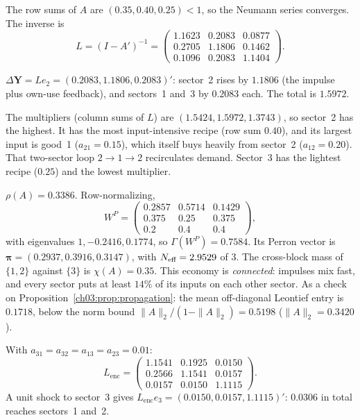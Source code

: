 \documentclass[../solutions_manual.tex]{subfiles}
\begin{document}

 The row sums of $A$ are $(0.35, 0.40, 0.25) < 1$, so the Neumann series converges. The inverse is
\[
L = (I - A')^{-1} = \begin{pmatrix} 1.1623 & 0.2083 & 0.0877\\ 0.2705 & 1.1806 & 0.1462\\ 0.1096 & 0.2083 & 1.1404\end{pmatrix}.
\]

 $\Delta\mathbf Y = L e_2 = (0.2083, 1.1806, 0.2083)'$: sector~2 rises by $1.1806$ (the impulse plus own-use feedback), and sectors~1 and~3 by $0.2083$ each. The total is $1.5972$.

 The multipliers (column sums of $L$) are $(1.5424, 1.5972, 1.3743)$, so sector~2 has the highest. It has the most input-intensive recipe (row sum $0.40$), and its largest input is good~1 ($a_{21} = 0.15$), which itself buys heavily from sector~2 ($a_{12} = 0.20$). That two-sector loop $2 \to 1 \to 2$ recirculates demand. Sector~3 has the lightest recipe ($0.25$) and the lowest multiplier.

 $\rho(A) = 0.3386$. Row-normalizing,
\[
W^P = \begin{pmatrix} 0.2857 & 0.5714 & 0.1429\\ 0.375 & 0.25 & 0.375\\ 0.2 & 0.4 & 0.4\end{pmatrix},
\]
with eigenvalues $1, -0.2416, 0.1774$, so $\Gamma(W^P) = 0.7584$. Its Perron vector is $\boldsymbol\pi = (0.2937, 0.3916, 0.3147)$, with $N_{\text{eff}} = 2.9529$ of 3. The cross-block mass of $\{1,2\}$ against $\{3\}$ is $\chi(A) = 0.35$. This economy is \emph{connected}: impulses mix fast, and every sector puts at least $14\%$ of its inputs on each other sector. As a check on Proposition~\ref{ch03:prop:propagation}: the mean off-diagonal Leontief entry is $0.1718$, below the norm bound $\|A\|_2/(1 - \|A\|_2) = 0.5198$ ($\|A\|_2 = 0.3420$).


 With $a_{31} = a_{32} = a_{13} = a_{23} = 0.01$:
\[
L_{\text{enc}} = \begin{pmatrix} 1.1541 & 0.1925 & 0.0150\\ 0.2566 & 1.1541 & 0.0157\\ 0.0157 & 0.0150 & 1.1115\end{pmatrix}.
\]
A unit shock to sector~3 gives $L_{\text{enc}}e_3 = (0.0150, 0.0157, 1.1115)'$: $0.0306$ in total reaches sectors~1 and~2.
\end{document}
